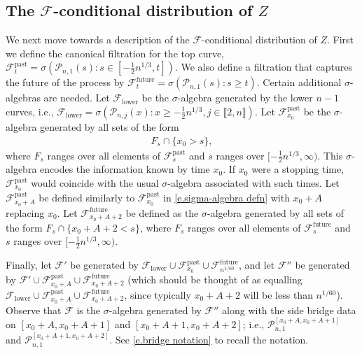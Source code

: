 \documentclass[oneside,final,11pt]{amsart}
\theoremstyle{definition}
\renewcommand{\L}{\CP}
\newcommand{\1}[1]{\mathbf{1}_{#1}}
\newcommand{\F}{\mathscr{F}}
\newcommand{\CP}{\mathcal{P}}
\numberwithin{equation}{section}
\begin{document}
\subsection{The $\F$-conditional distribution of $Z$}\label{s.F-conditionl distribution}
We next move towards a description of the $\F$-conditional distribution of $Z$.
First we define the canonical filtration for the top curve, $\F^{\mathrm{past}}_t = \sigma\left(\L_{n,1}(s) : s\in[ -\frac{1}{2}n^{1/3}, t]\right)$. We also define a filtration that captures the future of the process by $\F^{\mathrm{future}}_t = \sigma\left(\L_{n,1}(s) :s \geq t\right)$.
Certain additional $\sigma$-algebras are needed. Let $\F_{\mathrm{lower}}$ be the $\sigma$-algebra generated by the lower $n-1$ curves, i.e., $\F_{\mathrm{lower}} = \sigma(\L_{n,j}(x) : x\geq -\frac{1}{2}n^{1/3}, j\in\llbracket 2,n\rrbracket)$. Let $\F^{\mathrm{past}}_{x_0}$ be the $\sigma$-algebra generated by all sets of the form
%
\begin{align}\label{e.sigma-algebra defn}
F_s \cap \{x_0 > s\},
\end{align}
%
where $F_s$ ranges over all elements of $\F^{\mathrm{past}}_s$ and $s$ ranges over $[-\frac{1}{2}n^{1/3},\infty)$. This $\sigma$-algebra encodes the information known by time $x_0$. If $x_0$ were a stopping time, $\F^{\mathrm{past}}_{x_0}$ would coincide with the usual $\sigma$-algebra associated with such times. Let $\F^{\mathrm{past}}_{x_0+A}$ be defined similarly to $\F^{\mathrm{past}}_{x_0}$ in \eqref{e.sigma-algebra defn} with $x_0+A$ replacing $x_0$. Let $\F^{\mathrm{future}}_{x_0+A+2}$ be defined as the $\sigma$-algebra generated by all sets of the form $F_s \cap \{x_0+A+2 < s\}$, where $F_s$ ranges over all elements of $\F^{\mathrm{future}}_s$ and $s$ ranges over $[-\frac{1}{2}n^{1/3}, \infty)$.

Finally, let $\F'$ be generated by $\F_{\mathrm{lower}} \cup \F^{\mathrm{past}}_{x_0}\cup \F^{\mathrm{future}}_{n^{1/60}}$, and let $\F''$ be generated by $\F'\cup\F^{\mathrm{past}}_{x_0+A}\cup\F^{\mathrm{future}}_{x_0+A+2}$ (which should be thought of as equalling $\F_{\mathrm{lower}}\cup\F^{\mathrm{past}}_{x_0+A}\cup\F^{\mathrm{future}}_{x_0+A+2}$, since typically $x_0+A+2$ will be less than $n^{1/60}$). Observe that $\F$ is the $\sigma$-algebra generated by $\F''$ along with the side bridge data on $[x_0+A,x_0+A+1]$ and $[x_0+A+1,x_0+A+ 2]$; i.e., $\L_{n,1}^{[x_0+A,x_0+A+1]}$ and $\L_{n,1}^{[x_0+A+1,x_0+A+ 2]}$. See \eqref{e.bridge notation} to recall the notation.
\end{document}
